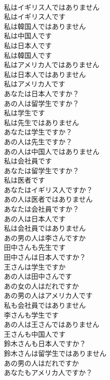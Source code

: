 \documentclass[8pt]{extreport}
\begin{document}
\begin{CJK}{UTF8}{min}
\\	私はイギリス人ではありません	
\\	私はイギリス人です	
\\	私は韓国人ではありません	
\\	私は中国人です	
\\	私は日本人です	
\\	私は韓国人です	
\\	私はアメリカ人ではありません	
\\	私は日本人ではありません	
\\	私はアメリカ人です	
\\	あなたは日本人ですか？	
\\	あの人は留学生ですか？	
\\	私は学生です	
\\	私は先生ではありません	
\\	あなたは学生ですか？	
\\	あの人は先生ですか？	
\\	あの人は中国人ではありません	
\\	私は会社員です	
\\	あなたは留学生ですか？	
\\	私は医者です	
\\	あなたはイギリス人ですか？	
\\	あの人は医者ではありません	
\\	あなたは会社員ですか？	
\\	あの人は日本人です	
\\	私は会社員ではありません	
\\	あの男の人は李さんですか	
\\	田中さんも先生です	
\\	田中さんは日本人ですか？	
\\	王さんは学生ですか	
\\	あの人は田中さんです	
\\	あの女の人はだれですか	
\\	あの男の人はアメリカ人です	
\\	私も会社員ではありません	
\\	李さんも学生です	
\\	あの人は王さんではありません	
\\	王さんも中国人です	
\\	鈴木さんも日本人ですか？	
\\	鈴木さんは留学生ではありません	
\\	あの男の人はだれですか	
\\	あなたもアメリカ人ですか？	

\end{CJK}
\end{document}
